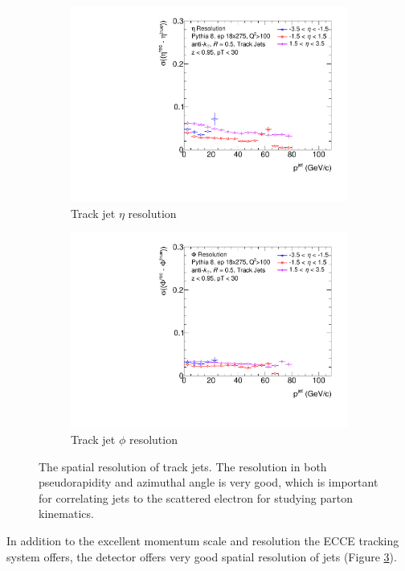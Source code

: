\begin{figure}[h]
    \centering
    \begin{subfigure}{0.4\textwidth}
        \centering
        \includegraphics[width=\linewidth]{figs/Final_Plots/EtaReso_track_grouped.pdf}
        \caption{Track jet $\eta$ resolution}
        \label{fig:track_eta_resolution}
    \end{subfigure}
    \hfill
    \begin{subfigure}{0.4\textwidth}
        \centering
        \includegraphics[width=\linewidth]{figs/Final_Plots/PhiReso_track_grouped.pdf}
        \caption{Track jet $\phi$ resolution}
        \label{fig:track_phi_resolution}
    \end{subfigure}
    \caption{The spatial resolution of track jets.  The resolution in both pseudorapidity and azimuthal angle is very good, which is important for correlating jets to the scattered electron for studying parton kinematics.  }
    \label{fig:track_spatial_reso_scale}
\end{figure}

In addition to the excellent momentum scale and resolution the ECCE tracking system offers, the detector offers very good spatial resolution of jets (Figure \ref{fig:track_spatial_reso_scale}).
